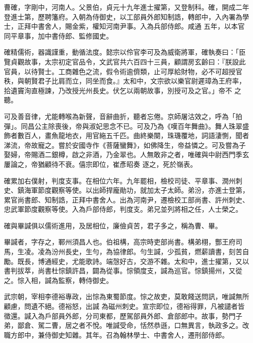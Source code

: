 \begin{pinyinscope}
 曹確，字剛中，河南人。父景伯，貞元十九年進士擢第，又登制科。確，開成二年登進士第，歷聘籓府。入朝為侍御史，以工部員外郎知制誥，轉郎中，入內署為學士，正拜中書舍人，賜金紫，權知河南尹事。入為兵部侍郎。咸通
 五年，以本官同平章事，加中書侍郎、監修國史。



 確精儒術，器識謹重，動循法度。懿宗以伶官李可及為威衛將軍，確執奏曰：「臣覽貞觀故事，太宗初定官品令，文武官共六百四十三員，顧謂房玄齡曰：『朕設此官員，以待賢士。工商雜色之流，假令術逾儕類，止可厚給財物，必不可超授官秩，與朝賢君子比肩而立，同坐而食。』太和中，文宗欲以樂官尉遲璋為王府率，拾遺竇洵直極諫，乃改授光州長史。伏乞以兩朝故事，別授可及之官。」帝不
 之聽。



 可及善音律，尤能轉喉為新聲，音辭曲折，聽者忘倦。京師屠沽效之，呼為「拍彈」。同昌公主除喪後，帝與淑妃思念不已。可及乃為《嘆百年舞曲》。舞人珠翠盛飾者數百人，畫魚龍地衣，用官絁五千匹。曲終樂闋，珠璣覆地，詞語淒惻，聞者涕流，帝故寵之。嘗於安國寺作《菩薩蠻舞》，如佛降生，帝益憐之。可及嘗為子娶婦，帝賜酒二銀樽，啟之非酒，乃金翠也。人無敢非之者，唯確與中尉西門季玄屢論之，帝猶顧待不衰。僖宗即位，崔彥昭奏
 逐之，死於嶺表。



 確累加右僕射，判度支事。在相位六年。九年罷相，檢校司徒、平章事、潤州刺史、鎮海軍節度觀察等使。以出師捍龐勛功，就加太子太師。弟汾，亦進士登第，累官尚書郎、知制誥，正拜中書舍人。出為河南尹，遷檢校工部尚書、許州刺史、忠武軍節度觀察等使。入為戶部侍郎，判度支。弟兄並列將相之任，人士榮之。



 確與畢諴俱以儒術進用，及居相位，廉儉貞苦，君子多之，稱為曹、畢。



 畢諴者，字存之，鄆州須昌人也。伯祖構，高宗時吏部尚書。構弟栩，酆王府司馬，生凌。凌為汾州長史，生勻，為協律郎。勻生諴，少孤貧，燃薪讀書，刻苦自勵。既長，博通經史，尤能歌詩。端愨好古，交游不雜。太和中，進士擢第，又以書判拔萃，尚書杜悰鎮許昌，闢為從事。悰領度支，諴為巡官。悰鎮揚州，又從之。悰入相，諴為監察，轉侍御史。



 武宗朝，宰相李德裕專政，出悰為東蜀節度。悰之故吏，莫敢餞送問訊，唯諴無所顧慮，問遺不絕。德裕怒，出諴
 為磁州刺史。宣宗即位，德裕得罪，凡被譴者皆徵還。諴入為戶部員外郎，分司東都，歷駕部員外郎、倉部郎中。故事，勢門子弟，鄙倉、駕二曹，居之者不悅。唯諴受命，恬然恭遜，口無異言，執政多之。改職方郎中，兼侍御史知雜。其年。召為翰林學士、中書舍人，遷刑部侍郎。




\end{pinyinscope}
